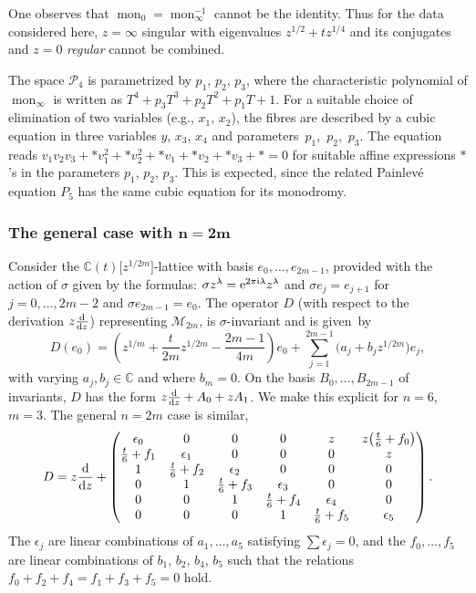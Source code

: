 \documentclass[pdftex]{sigma}
\numberwithin{equation}{section}
\begin{document}
 One observes that $\operatorname{mon}_0=\operatorname{mon}_\infty^{-1}$ cannot be the identity. Thus for the data considered here, $z=\infty$ singular with
 eigenvalues $z^{1/2}+tz^{1/4}$ and its conjugates and $z=0$ {\it regular} cannot be combined.



 The space $\mathcal{P}_4$ is parametrized by $p_1$, $p_2$, $p_3$, where the characteristic polynomial of $\operatorname{mon}_\infty$ is written as $T^4+p_3T^3+p_2T^2+p_1T+1$. For a suitable choice of
 elimination of two variables (e.g., $x_1$, $x_2$), the fibres are described by a cubic equation in three variables $y$, $x_3$, $x_4$ and parameters~$p_1$,~$p_2$,~$p_3$. The equation reads
 $v_1v_2v_3+*v_1^2+*v_2^2+*v_1+*v_2+*v_3+*=0$ for suitable affine expressions $*$'s in the parameters
 $p_1$, $p_2$, $p_3$. This is expected, since the related Painlev\'e equation $P_5$ has the same cubic equation for its monodromy.

 \subsubsection[The general case with n=2m]{The general case with $\boldsymbol{n=2m}$}

 Consider the $\mathbb{C}(t)\bigl[z^{1/2m}\bigr]$-lattice with basis $e_0,\dots ,e_{2m-1}$, provided with
 the action of $\sigma$ given by the formulas: $\sigma z^\lambda ={\rm e}^{2\pi {\rm i} \lambda}z^\lambda$ and
 $\sigma e_j=e_{j+1}$ for $j=0,\dots ,2m-2$ and $\sigma e_{2m-1}=e_0$. The operator $D$
 (with respect to the derivation $z\frac{{\rm d}}{{\rm d}z}$) representing $\mathcal{M}_{2m}$, is $\sigma$-invariant
 and is given~by
 \[D(e_0)=\left(z^{1/m}+\frac{t}{2m}z^{1/2m}-\frac{2m-1}{4m}\right)e_0 +\sum_{j=1}^{2m-1}\bigl(a_j+b_jz^{1/2m}\bigr)e_j,\]
with varying $a_j,b_j\in \mathbb{C}$ and where $b_m=0$.
 On the basis $B_0,\dots, B_{2m-1}$ of invariants, $D$ has the form $z\frac{{\rm d}}{{\rm d}z}+A_0+zA_1$.
 We make this explicit for $n=6$, $m=3$. The general $n=2m$ case is similar,
 \[ D=z\frac{{\rm d}}{{\rm d}z}+
\begin{pmatrix} \epsilon_0 &0 &0 &0 &z &z\bigl(\frac{t}{6}+f_0\bigr) \\
 \frac{t}{6}+f_1&\epsilon_1 &0 &0 &0 &z \\
 1&\frac{t}{6}+f_2 &\epsilon_2 &0 &0 &0 \\
 0& 1& \frac{t}{6}+f_3&\epsilon_3 &0 &0 \\
 0&0 &1 &\frac{t}{6}+f_4 &\epsilon_4 &0\\
 0&0 &0 & 1&\frac{t}{6}+f_5 & \epsilon _5\end{pmatrix}. \]
 The $\epsilon_j$ are linear combinations of $a_1,\dots ,a_5$ satisfying $\sum \epsilon_j=0$, and the
 $f_0,\dots ,f_5$ are linear combinations of $b_1$, $b_2$, $b_4$, $b_5$
 such that the relations $f_0+f_2+f_4=f_1+f_3+f_5=0$ hold.
\end{document}
